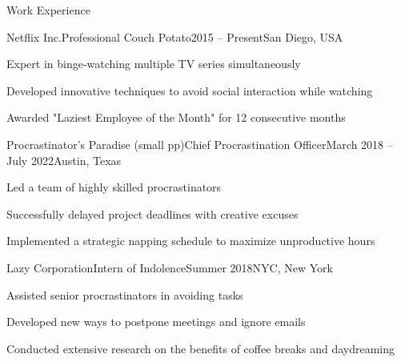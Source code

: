 

\begin{section}{Work Experience}
    \begin{subsection}{Netflix Inc.}{Professional Couch Potato}{2015 -- Present}{San Diego, USA}
        \item Expert in binge-watching multiple TV series simultaneously
        \item Developed innovative techniques to avoid social interaction while watching
        \item Awarded "Laziest Employee of the Month" for 12 consecutive months
    \end{subsection}

    \begin{subsection}{Procrastinator's Paradise (small pp)}{Chief Procrastination Officer}{March 2018 -- July 2022}{Austin, Texas}
        \item Led a team of highly skilled procrastinators
        \item Successfully delayed project deadlines with creative excuses
        \item Implemented a strategic napping schedule to maximize unproductive hours
    \end{subsection}

    \begin{subsection}{Lazy Corporation}{Intern of Indolence}{Summer 2018}{NYC, New York}
        \item Assisted senior procrastinators in avoiding tasks
        \item Developed new ways to postpone meetings and ignore emails
        \item Conducted extensive research on the benefits of coffee breaks and daydreaming
    \end{subsection}

\end{section}

